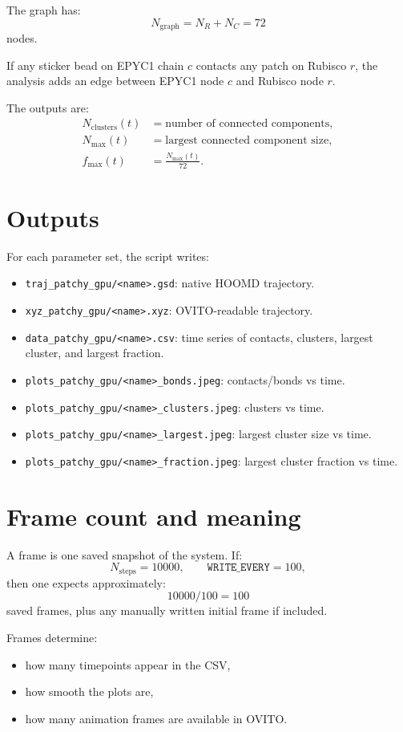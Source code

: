 \documentclass[11pt]{article}
\begin{document}
The graph has:
\[
N_{\mathrm{graph}} = N_R + N_C = 72
\]
nodes.

If any sticker bead on EPYC1 chain \(c\) contacts any patch on Rubisco \(r\), the analysis adds an edge between EPYC1 node \(c\) and Rubisco node \(r\).

The outputs are:
\begin{align}
N_{\mathrm{clusters}}(t) &= \text{number of connected components},\\
N_{\max}(t) &= \text{largest connected component size},\\
f_{\max}(t) &= \frac{N_{\max}(t)}{72}.
\end{align}

\section{Outputs}

For each parameter set, the script writes:

\begin{itemize}
    \item \texttt{traj\_patchy\_gpu/<name>.gsd}: native HOOMD trajectory.
    \item \texttt{xyz\_patchy\_gpu/<name>.xyz}: OVITO-readable trajectory.
    \item \texttt{data\_patchy\_gpu/<name>.csv}: time series of contacts, clusters, largest cluster, and largest fraction.
    \item \texttt{plots\_patchy\_gpu/<name>\_bonds.jpeg}: contacts/bonds vs time.
    \item \texttt{plots\_patchy\_gpu/<name>\_clusters.jpeg}: clusters vs time.
    \item \texttt{plots\_patchy\_gpu/<name>\_largest.jpeg}: largest cluster size vs time.
    \item \texttt{plots\_patchy\_gpu/<name>\_fraction.jpeg}: largest cluster fraction vs time.
\end{itemize}

\section{Frame count and meaning}

A frame is one saved snapshot of the system. If:
\[
N_{\mathrm{steps}} = 10000,
\qquad
\texttt{WRITE\_EVERY} = 100,
\]
then one expects approximately:
\[
10000/100 = 100
\]
saved frames, plus any manually written initial frame if included.

Frames determine:
\begin{itemize}
    \item how many timepoints appear in the CSV,
    \item how smooth the plots are,
    \item how many animation frames are available in OVITO.
\end{itemize}
\end{document}
